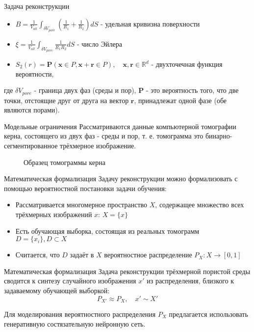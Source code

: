 \documentclass[12pt]{beamer}
\begin{document}
	\begin{frame}{Задача реконструкции}
		\begin{itemize}
			\item $ \displaystyle B = \frac{1}{V_{all}} \int_{\delta V_{pore}} \left ( \frac{1}{R_1} + \frac{1}{R_2} \right ) dS$ - удельная кривизна поверхности
			\item $\displaystyle \xi = \frac{1}{V_{all}} \int_{\delta V_{pore}} \frac{1}{R_1 R_2} dS $ - число Эйлера
			\item $ S_2(r) = \boldsymbol{P}(\boldsymbol{x} \in P, \boldsymbol{x}+\boldsymbol{r} \in P), \quad \boldsymbol{x}, \boldsymbol{r} \in \mathbb{R}^d $ - двухточечная функция вероятности,
		\end{itemize}
		где $\delta V_{pore}$ - граница двух фаз (среды и пор), $\boldsymbol{P}$ - это вероятность того, что две точки, отстоящие друг от друга на вектор $\boldsymbol{r}$, принадлежат одной фазе (обе являются порами).
	\end{frame}
	
	\begin{frame}{Модельные ограничения}
		Рассматриваются данные компьютерной томографии керна, состоящего из двух фаз - среды и пор, т. е. томограмма это бинарно-сегментированное трёхмерное изображение.
		\begin{figure}[h]
			\vfill
			Образец томограммы керна
		\end{figure}
	\end{frame}
	
	\begin{frame}{Математическая формализация}
		Задачу реконструкции можно формализовать с помощью вероятностной постановки задачи обучения:
		\begin{itemize}
			\item Рассматривается многомерное пространство $X$, содержащее множество всех трёхмерных изображений $x$: $X = \{x\}$
			\item Есть обучающая выборка, состоящая из реальных томограмм $D = \{x_i\}, D \subset X$
			\item Считается, что  $D$ задаёт в $X$ вероятностное распределение $P_X : X \longrightarrow [0,1]$
		\end{itemize}
	\end{frame}
	
	\begin{frame}{Математическая формализация}
		Задача реконструкции трёхмерной пористой среды сводится к синтезу случайного изображения $x'$ из распределения, близкого к задаваемому обучающей выборкой:
		$$ P_{X'} \approx P_X, \quad x' \sim X'$$
		
		Для моделирования вероятностного распределения $P_X$ предлагается использовать генеративную состязательную нейронную сеть.
	\end{frame}
	
\end{document}
